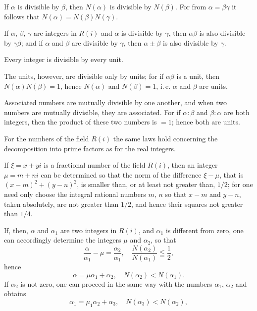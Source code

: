 
If $\alpha$ is divisible by $\beta$, then $N(\alpha)$ is divisible by $N(\beta)$.
For from $\alpha=\beta\gamma$ it follows that $N(\alpha)=N(\beta)N(\gamma)$.

If $\alpha$, $\beta$, $\gamma$ are integers in $R(i)$ and $\alpha$ is divisible by $\gamma$,
then $\alpha\beta$ is also divisible by $\gamma\beta$; and if $\alpha$ and $\beta$ are divisible by $\gamma$,
then $\alpha\pm\beta$ is also divisible by $\gamma$.

Every integer is divisible by every unit.

The units, however, are divisible only by units; for
if $\alpha\beta$ is a unit, then $N(\alpha)N(\beta)=1$, hence $N(\alpha)$ and
$N(\beta)=1$, i.\,e. $\alpha$ and $\beta$ are units.

Associated numbers are mutually divisible by one another,
and when two numbers are mutually divisible, they are
associated. For if $\alpha:\beta$ and $\beta:\alpha$ are both integers, then
the product of these two numbers is $=1$; hence both are units.

For the numbers of the field $R(i)$ the same
laws hold concerning the decomposition into prime factors as for the real
integers.



If $\xi=x+yi$ is a fractional number of the field $R(i)$, then
an integer $\mu=m+ni$ can be determined so that the
norm of the difference $\xi-\mu$, that is $(x-m)^2+(y-n)^2$, is smaller
than, or at least not greater than, $1/2$; for one need only
choose the integral rational numbers $m$, $n$ so that $x-m$
and $y-n$, taken absolutely, are not greater than $1/2$, and hence their squares
not greater than $1/4$.

If, then, $\alpha$ and $\alpha_1$ are two integers in $R(i)$, and $\alpha_1$ is
different from zero, one can accordingly determine the integers $\mu$
and $\alpha_2$, so that
\[
\frac{\alpha}{\alpha_1}-\mu=\frac{\alpha_2}{\alpha_1},\quad \frac{N(\alpha_2)}{N(\alpha_1)}\leqq \frac{1}{2},
\]
hence
\[
\alpha=\mu\alpha_1+\alpha_2,\quad N(\alpha_2)<N(\alpha_1).
\]
If $\alpha_2$ is not zero, one can proceed in the same way with the numbers
$\alpha_1$, $\alpha_2$ and obtains
\[
\alpha_1=\mu_1\alpha_2+\alpha_3,\quad N(\alpha_3)<N(\alpha_2),
\]
